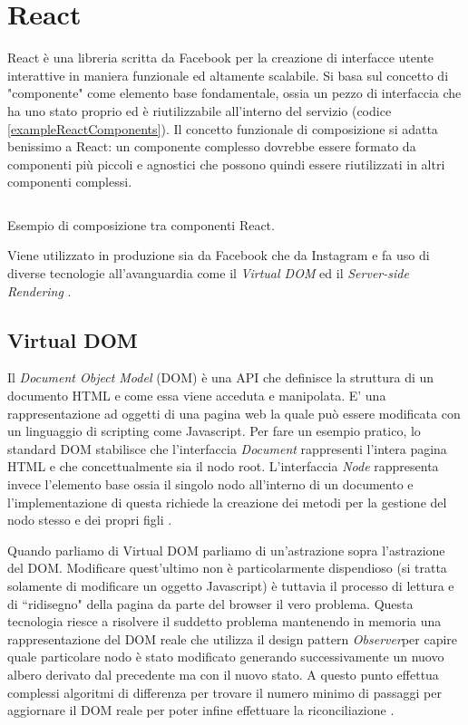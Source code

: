 \section{React}
React è una libreria scritta da Facebook per la creazione di interfacce utente interattive in maniera funzionale ed altamente scalabile. Si basa sul concetto di "componente" come elemento base fondamentale, ossia un pezzo di interfaccia che ha uno stato proprio ed è riutilizzabile all'interno del servizio (codice \ref{exampleReactComponents}). Il concetto funzionale di composizione si adatta benissimo a React: un componente complesso dovrebbe essere formato da componenti più piccoli e agnostici che possono quindi essere riutilizzati in altri componenti complessi.

\begin{listing}[ht]
\inputminted{jsx}{sources/exampleReactComponents.js}
\caption{Esempio di composizione tra componenti React.}
\label{exampleReactComponents}
\end{listing}

Viene utilizzato in produzione sia da Facebook che da Instagram e fa uso di diverse tecnologie all'avanguardia come il \textit{Virtual DOM} ed il \textit{Server-side Rendering} \cite{WheelerOnReact}.

\subsection{Virtual DOM}
Il  \textit{Document Object Model} (DOM) è una API che definisce la struttura di un documento HTML e come essa viene acceduta e manipolata. E' una rappresentazione ad oggetti di una pagina web la quale può essere modificata con un linguaggio di scripting come Javascript.
Per fare un esempio pratico, lo standard DOM stabilisce che l'interfaccia \textit{Document} rappresenti l'intera pagina HTML e che concettualmente sia il nodo root. L'interfaccia \textit{Node} rappresenta invece l'elemento base ossia il singolo nodo all'interno di un documento e l'implementazione di questa richiede la creazione dei metodi per la gestione del nodo stesso e dei propri figli \cite{HWRWhatIsDOM}.

Quando parliamo di Virtual DOM parliamo di un'astrazione sopra l'astrazione del DOM. Modificare quest'ultimo non è particolarmente dispendioso (si tratta solamente di modificare un oggetto Javascript) è tuttavia il processo di lettura e di “ridisegno" della pagina da parte del browser il vero problema. Questa tecnologia riesce a risolvere il suddetto problema mantenendo in memoria una rappresentazione del DOM reale che utilizza il design pattern \textit{Observer}\footnotemark per capire quale particolare nodo è stato modificato generando successivamente un nuovo albero derivato dal precedente ma con il nuovo stato. A questo punto effettua complessi algoritmi di differenza per trovare il numero minimo di passaggi per aggiornare il DOM reale per poter infine effettuare la riconciliazione \cite{MishraOnVirtualDOM}.

